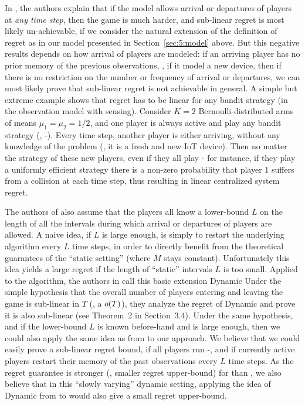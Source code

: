 In \cite{Rosenski16}, the authors explain that if the model allows arrival or departures of players at \emph{any time step}, then the game is much harder, and sub-linear regret is most likely un-achievable, if we consider the natural extension of the definition of regret as in our model presented in Section~\ref{sec:5:model} above.
But this negative results depends on how arrival of players are modeled:
if an arriving player has no prior memory of the previous observations, \ie, if it model a new device, then if there is no restriction on the number or frequency of arrival or departures, we can most likely prove that sub-linear regret is not achievable in general.
A simple but extreme example shows that regret has to be linear for any bandit strategy (in the observation model with sensing).
Consider $K=2$ Bernoulli-distributed arms of means $\mu_1=\mu_2=1/2$, and one player is always active and play any bandit strategy (\eg, \MCTopM-\klUCB).
Every time step, another player is either arriving, without any knowledge of the problem (\eg, it is a fresh and new IoT device). Then no matter the strategy of these new players, even if they all play \MCTopM-\klUCB{} for instance, if they play a uniformly efficient strategy there is a non-zero probability that player $1$ suffers from a collision at each time step, thus resulting in linear centralized system regret.

The authors of \cite{Rosenski16} also assume that the players all know a lower-bound $L$ on the length of all the intervals during which arrival or departures of players are allowed.
A naive idea, if $L$ is large enough, is simply to restart the underlying algorithm every $L$ time steps, in order to directly benefit from the theoretical guarantees of the ``static setting'' (where $M$ stays constant).
Unfortunately this idea yields a large regret if the length of ``static'' intervals $L$ is too small.
Applied to the \MusicalChair{} algorithm, the authors in \cite{Rosenski16} call this basic extension Dynamic \MusicalChair
Under the simple hypothesis that the overall number of players entering and leaving the game is sub-linear in $T$ (\ie, a $\mathop{}\mathopen{}o\mathopen{}\left(T\right)$), they analyze the regret of Dynamic \MusicalChair{} and prove it is also sub-linear (see Theorem~2 in Section~3.4).
%
Under the same hypothesis, and if the lower-bound $L$ is known before-hand and is large enough, then we could also apply the same idea as from \cite{Rosenski16} to our approach. We believe that we could easily prove a sub-linear regret bound, if all players run \MCTopM-\klUCB, and if currently active players restart their memory of the past observations every $L$ time steps.
As the regret guarantee is stronger (\ie, smaller regret upper-bound) for \MCTopM{} than \MusicalChair, we also believe that in this ``slowly varying'' dynamic setting, applying the idea of Dynamic \MusicalChair{} from \cite{Rosenski16} to \MCTopM{} would also give a small regret upper-bound.

